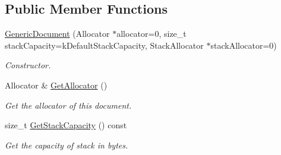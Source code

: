 \subsection*{Public Member Functions}
\begin{DoxyCompactItemize}
\item 
\hyperlink{class_generic_document_a6b1c313ad538cafc4d23d4bd5f97178c}{Generic\+Document} (Allocator $\ast$allocator=0, size\+\_\+t stack\+Capacity=k\+Default\+Stack\+Capacity, Stack\+Allocator $\ast$stack\+Allocator=0)
\begin{DoxyCompactList}\small\item\em Constructor. \end{DoxyCompactList}\item 
\hypertarget{class_generic_document_aa4609d6b19f86aec1a6b96edf2c27686}{}Allocator \& \hyperlink{class_generic_document_aa4609d6b19f86aec1a6b96edf2c27686}{Get\+Allocator} ()\label{class_generic_document_aa4609d6b19f86aec1a6b96edf2c27686}

\begin{DoxyCompactList}\small\item\em Get the allocator of this document. \end{DoxyCompactList}\item 
\hypertarget{class_generic_document_aa99f03016f4907332fcf70aadb645194}{}size\+\_\+t \hyperlink{class_generic_document_aa99f03016f4907332fcf70aadb645194}{Get\+Stack\+Capacity} () const \label{class_generic_document_aa99f03016f4907332fcf70aadb645194}

\begin{DoxyCompactList}\small\item\em Get the capacity of stack in bytes. \end{DoxyCompactList}\end{DoxyCompactItemize}
